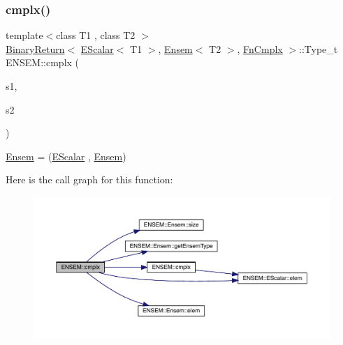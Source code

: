 \subsubsection{\texorpdfstring{cmplx()}{cmplx()}\hspace{0.1cm}{\footnotesize\ttfamily [3/3]}}
{\footnotesize\ttfamily template$<$class T1 , class T2 $>$ \\
\mbox{\hyperlink{structENSEM_1_1BinaryReturn}{Binary\+Return}}$<$ \mbox{\hyperlink{classENSEM_1_1EScalar}{E\+Scalar}}$<$ T1 $>$, \mbox{\hyperlink{classENSEM_1_1Ensem}{Ensem}}$<$ T2 $>$, \mbox{\hyperlink{structENSEM_1_1FnCmplx}{Fn\+Cmplx}} $>$\+::Type\+\_\+t E\+N\+S\+E\+M\+::cmplx (\begin{DoxyParamCaption}\item[{const \mbox{\hyperlink{classENSEM_1_1EScalar}{E\+Scalar}}$<$ T1 $>$ \&}]{s1,  }\item[{const \mbox{\hyperlink{classENSEM_1_1Ensem}{Ensem}}$<$ T2 $>$ \&}]{s2 }\end{DoxyParamCaption})\hspace{0.3cm}{\ttfamily [inline]}}



\mbox{\hyperlink{classENSEM_1_1Ensem}{Ensem}} = (\mbox{\hyperlink{classENSEM_1_1EScalar}{E\+Scalar}} , \mbox{\hyperlink{classENSEM_1_1Ensem}{Ensem}}) 

Here is the call graph for this function\+:\nopagebreak
\begin{figure}[H]
\begin{center}
\leavevmode
\includegraphics[width=350pt]{d1/d9e/group__eensem_gae141b1babc25cfea8bcda2218aea5125_cgraph}
\end{center}
\end{figure}
\mbox{\label{group__eensem_ga539331970eb8111bc1c56f049612dce8}} 
